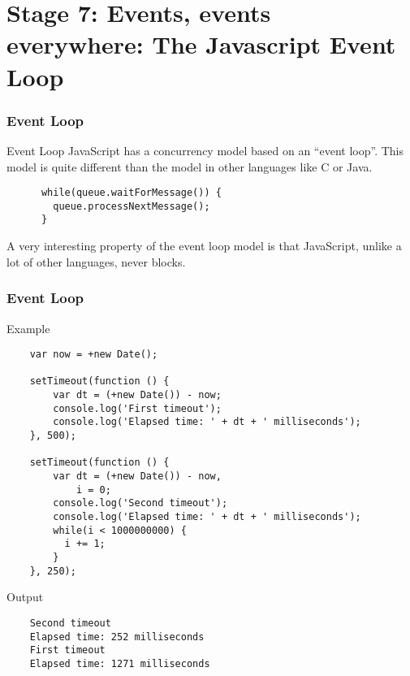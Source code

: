 \section{Stage 7: Events, events everywhere: The Javascript Event Loop}

\begin{frame}[fragile]
  \begin{center}
  \end{center}
\end{frame}

\begin{frame}[fragile]
  \frametitle{Event Loop}
  \begin{block}{Event Loop}
    JavaScript has a concurrency model based on an ``event loop''. This model is quite different than the model in other languages like C or Java.
    {\scriptsize
    \begin{verbatim}
      while(queue.waitForMessage()) {
        queue.processNextMessage();
      }
    \end{verbatim}
    }
    \pause
    A very interesting property of the event loop model is that JavaScript, unlike a lot of other languages, never blocks.
  \end{block}
\end{frame}

\begin{frame}[fragile]
  \frametitle{Event Loop}

  \begin{block}{Example}
    {\tiny
    \begin{verbatim}
    var now = +new Date();

    setTimeout(function () {
        var dt = (+new Date()) - now;
        console.log('First timeout');
        console.log('Elapsed time: ' + dt + ' milliseconds');
    }, 500);

    setTimeout(function () {
        var dt = (+new Date()) - now,
            i = 0;
        console.log('Second timeout');
        console.log('Elapsed time: ' + dt + ' milliseconds');
        while(i < 1000000000) {
          i += 1;
        }
    }, 250);
    \end{verbatim}
    }
  \end{block}

  \pause

  \begin{block}{Output}
    {\tiny
    \begin{verbatim}
    Second timeout
    Elapsed time: 252 milliseconds
    First timeout
    Elapsed time: 1271 milliseconds
    \end{verbatim}
    }
  \end{block}
\end{frame}

